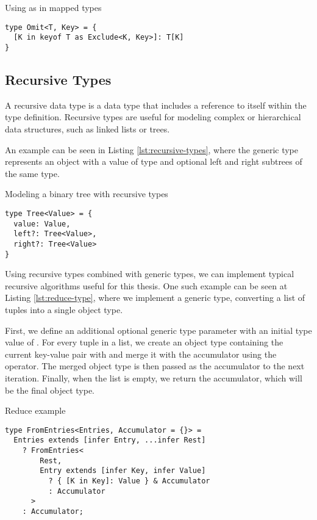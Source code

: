 \begin{listing}[ht]
  \caption{Using as in mapped types}\label{lst:mapped-as}
  \begin{verbatim}
type Omit<T, Key> = {
  [K in keyof T as Exclude<K, Key>]: T[K]
}
\end{verbatim}
\end{listing}

\subsection{Recursive Types}

A recursive data type is a data type that includes a reference to itself within the type definition. Recursive types are useful for modeling complex or hierarchical data structures, such as linked lists or trees.

An example can be seen in Listing \ref{lst:recursive-types}, where the  generic type represents an object with a value of type  and optional left and right subtrees of the same type.

\begin{listing}[ht]
  \caption{Modeling a binary tree with recursive types}\label{lst:recursive-types}
  \begin{verbatim}
type Tree<Value> = {
  value: Value,
  left?: Tree<Value>,
  right?: Tree<Value>
}
\end{verbatim}
\end{listing}

Using recursive types combined with generic types, we can implement typical recursive algorithms useful for this thesis. One such example can be seen at Listing \ref{lst:reduce-type}, where we implement a  generic type, converting a list of  tuples into a single object type.

First, we define an additional optional generic type parameter  with an initial type value of \code{{}}. For every tuple in a list, we create an object type containing the current key-value pair with  and merge it with the accumulator using the \vcode{&} operator. The merged object type is then passed as the accumulator to the next iteration. Finally, when the list is empty, we return the accumulator, which will be the final object type.

\begin{listing}[ht]
  \caption{Reduce example}\label{lst:reduce-type}
  \begin{verbatim}
type FromEntries<Entries, Accumulator = {}> =
  Entries extends [infer Entry, ...infer Rest]
    ? FromEntries<
        Rest,
        Entry extends [infer Key, infer Value]
          ? { [K in Key]: Value } & Accumulator
          : Accumulator
      >
    : Accumulator;
\end{verbatim}
\end{listing}

